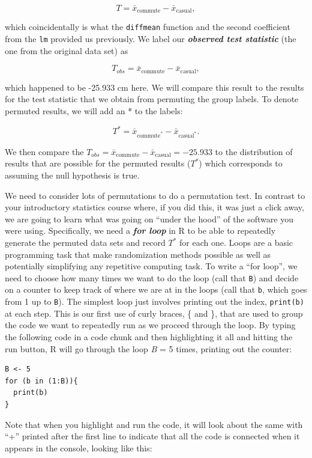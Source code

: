 \documentclass[
]{book}
\begin{document}
\[T = \bar{x}_\text{commute} - \bar{x}_\text{casual},\]

which coincidentally is what the \texttt{diffmean} function and the second coefficient from the \texttt{lm} provided us previously.
We label our \textbf{\emph{observed test statistic}} (the one from the original data
set) as

\[T_{obs} = \bar{x}_\text{commute} - \bar{x}_\text{casual},\]

which happened to be -25.933 cm here. We will compare this result to the results
for the test statistic that we obtain from permuting the group labels. To
denote permuted results, we will add an * to the labels:

\[T^* = \bar{x}_{\text{commute}^*}-\bar{x}_{\text{casual}^*}.\]

We then compare the \(T_{obs} = \bar{x}_\text{commute} - \bar{x}_\text{casual} = -25.933\)
to the distribution of results that are possible for the permuted results (\(T^*\))
which corresponds to assuming the null hypothesis is true.

\indent We need to consider lots of permutations to do a permutation test.
In contrast to
your introductory statistics course where, if you did this, it was just a click
away, we are going to learn what was going on ``under the hood'' of the software you were using. Specifically, we
need a \textbf{\emph{for loop}}  in R to be able to repeatedly generate the permuted data
sets and record \(T^*\) for each one. Loops are a basic programming task that make
randomization methods possible as well as potentially simplifying any repetitive
computing task. To write a ``for loop'', we need to choose how many times we want
to do the loop (call that \texttt{B}) and decide on a counter to keep track of where
we are at in the loops (call that \texttt{b}, which goes from 1 up to \texttt{B}). The
simplest loop just involves printing out the index, \texttt{print(b)} at each step.
This is our first use of curly braces, \{ and \}, that are used to group the code
we want to repeatedly run as we proceed through the loop. By typing the following
code in a code chunk and then highlighting it all and hitting the run button,
R will go through the loop \emph{B} = 5 times, printing out the counter:

\begin{verbatim}
B <- 5
for (b in (1:B)){
  print(b)
}
\end{verbatim}

Note that when you highlight and run the code, it will look about the same with
``+'' printed after the first line to indicate that all the code is connected when
it appears in the console, looking like this:
\end{document}
